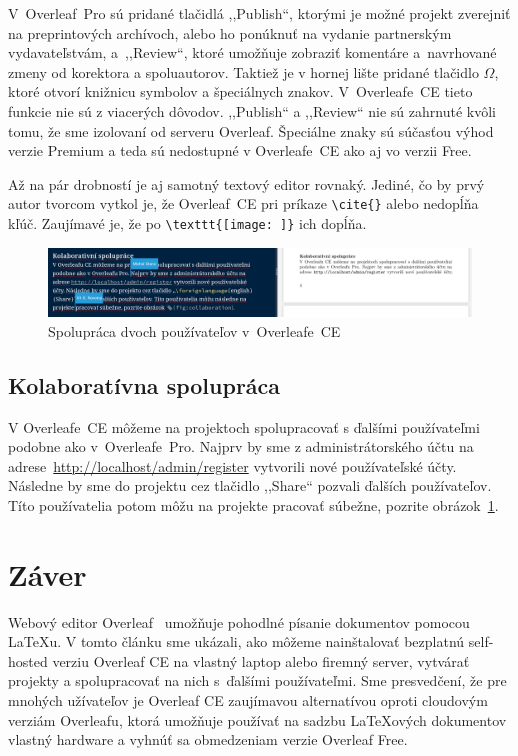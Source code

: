 \documentclass{csbulletin}
\begin{document}
V~Overleaf~Pro sú pridané tlačidlá ,,Publish``, ktorými je možné projekt zverejniť na preprintových archívoch, alebo ho ponúknuť na vydanie partnerským vydavateľstvám, a~,,Review``, ktoré umožňuje zobraziť komentáre a~navrhované zmeny od korektora a spoluautorov. Taktiež je v hornej lište pridané tlačidlo $\Omega$, ktoré otvorí knižnicu symbolov a špeciálnych znakov. V~Overleafe~CE tieto funkcie nie sú z viacerých dôvodov. ,,Publish`` a ,,Review`` nie sú zahrnuté kvôli tomu, že sme izolovaní od serveru Overleaf. Špeciálne znaky sú súčasťou výhod verzie Premium a teda sú nedostupné v Overleafe~CE ako aj vo verzii Free.

Až na pár drobností je aj samotný textový editor rovnaký. Jediné, čo by prvý autor tvorcom vytkol je, že Overleaf~CE pri príkaze \verb|\cite{}| alebo \verb|| nedopĺňa kľúč. Zaujímavé je, že po \verb|\texttt{[image: ]}| ich dopĺňa.

\begin{figure}[t]
    \centering
    \includegraphics[width=\textwidth]{collaboration}
    \par
    \vspace*{-0.5em}
    \caption{Spolupráca dvoch používateľov v~Overleafe~CE}
    \label{fig:collaboration}
\end{figure}

\vspace*{-0.5em}
\subsection{Kolaboratívna spolupráca}
V Overleafe~CE môžeme na projektoch spolupracovať s ďalšími používateľmi podobne ako v~Overleafe~Pro. Najprv by sme z administrátorského účtu na adrese~\url{http://localhost/admin/register} vytvorili nové používateľské účty. Následne by sme do projektu cez tlačidlo ,,\foreignlanguage{english}{Share}`` pozvali ďalších používateľov. Títo používatelia potom môžu na projekte pracovať súbežne, pozrite obrázok~\ref{fig:collaboration}.

\section{Záver}

Webový editor Overleaf~\cite{novotny2021overleaf} umožňuje pohodlné písanie dokumentov pomocou \LaTeX u. V tomto článku sme ukázali, ako môžeme nainštalovať bezplatnú self-hosted verziu Overleaf CE na vlastný laptop alebo firemný server, vytvárať projekty a spolupracovať na nich s~ďalšími používateľmi. Sme presvedčení, že pre mnohých užívateľov je Overleaf CE zaujímavou alternatívou oproti cloudovým verziám Overleafu, ktorá umožňuje používať na sadzbu \LaTeX ových dokumentov vlastný hardware a vyhnúť sa obmedzeniam verzie Overleaf Free.
\end{document}
